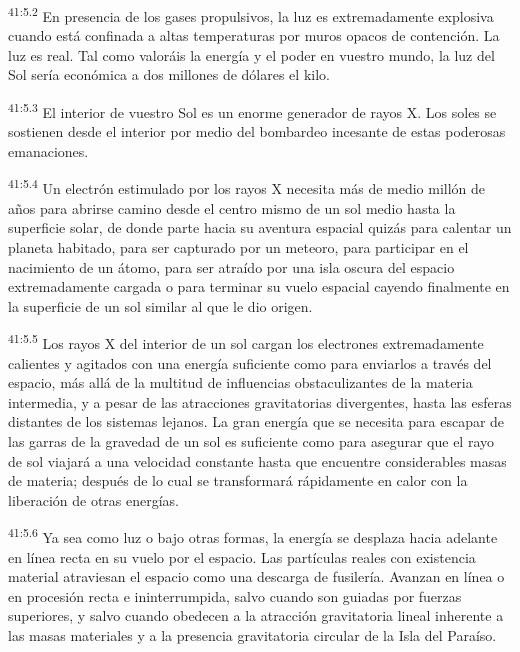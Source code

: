 \par
\textsuperscript{41:5.2} En presencia de los gases propulsivos, la luz es extremadamente explosiva cuando está confinada a altas temperaturas por muros opacos de contención. La luz es real. Tal como valoráis la energía y el poder en vuestro mundo, la luz del Sol sería económica a dos millones de dólares el kilo.

\par
\textsuperscript{41:5.3} El interior de vuestro Sol es un enorme generador de rayos X. Los soles se sostienen desde el interior por medio del bombardeo incesante de estas poderosas emanaciones.

\par
\textsuperscript{41:5.4} Un electrón estimulado por los rayos X necesita más de medio millón de años para abrirse camino desde el centro mismo de un sol medio hasta la superficie solar, de donde parte hacia su aventura espacial quizás para calentar un planeta habitado, para ser capturado por un meteoro, para participar en el nacimiento de un átomo, para ser atraído por una isla oscura del espacio extremadamente cargada o para terminar su vuelo espacial cayendo finalmente en la superficie de un sol similar al que le dio origen.

\par
\textsuperscript{41:5.5} Los rayos X del interior de un sol cargan los electrones extremadamente calientes y agitados con una energía suficiente como para enviarlos a través del espacio, más allá de la multitud de influencias obstaculizantes de la materia intermedia, y a pesar de las atracciones gravitatorias divergentes, hasta las esferas distantes de los sistemas lejanos. La gran energía que se necesita para escapar de las garras de la gravedad de un sol es suficiente como para asegurar que el rayo de sol viajará a una velocidad constante hasta que encuentre considerables masas de materia; después de lo cual se transformará rápidamente en calor con la liberación de otras energías.

\par
\textsuperscript{41:5.6} Ya sea como luz o bajo otras formas, la energía se desplaza hacia adelante en línea recta en su vuelo por el espacio. Las partículas reales con existencia material atraviesan el espacio como una descarga de fusilería. Avanzan en línea o en procesión recta e ininterrumpida, salvo cuando son guiadas por fuerzas superiores, y salvo cuando obedecen a la atracción gravitatoria lineal inherente a las masas materiales y a la presencia gravitatoria circular de la Isla del Paraíso.

